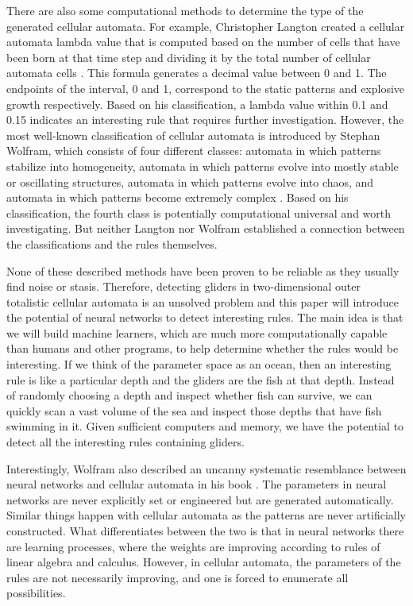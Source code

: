 \documentclass[12pt]{article}
\numberwithin{figure}{section} %
\begin{document}
There are also some computational methods to determine the type of the generated cellular automata. For example, Christopher Langton created a cellular automata lambda value that is computed based on the number of cells that have been born at that time step and dividing it by the total number of cellular automata cells \cite{Edge of Chaos}. This formula generates a decimal value between 0 and 1. The endpoints of the interval, 0 and 1, correspond to the static patterns and explosive growth respectively. Based on his classification, a lambda value within 0.1 and 0.15 indicates an interesting rule that requires further investigation. However, the most well-known classification of cellular automata is introduced by Stephan Wolfram, which consists of four different classes: automata in which patterns stabilize into homogeneity, automata in which patterns evolve into mostly stable or oscillating structures, automata in which patterns evolve into chaos, and automata in which patterns become extremely complex \cite{Cellular automaton}. Based on his classification, the fourth class is potentially computational universal and worth investigating. But neither Langton nor Wolfram established a connection between the classifications and the rules themselves.  

None of these described methods have been proven to be reliable as they usually find noise or stasis. Therefore, detecting gliders in two-dimensional outer totalistic cellular automata is an unsolved problem and this paper will introduce the potential of neural networks to detect interesting rules. The main idea is that we will build machine learners, which are much more computationally capable than humans and other programs, to help determine whether the rules would be interesting. If we think of the parameter space as an ocean, then an interesting rule is like a particular depth and the gliders are the fish at that depth. Instead of randomly choosing a depth and inspect whether fish can survive, we can quickly scan a vast volume of the sea and inspect those depths that have fish swimming in it. Given sufficient computers and memory, we have the potential to detect all the interesting rules containing gliders. 

Interestingly, Wolfram also described an uncanny systematic resemblance between neural networks and cellular automata in his book \cite{A new kind of Science}. The parameters in neural networks are never explicitly set or engineered but are generated automatically. Similar things happen with cellular automata as the patterns are never artificially constructed. What differentiates between the two is that in neural networks there are learning processes, where the weights are improving according to rules of linear algebra and calculus. However, in cellular automata, the parameters of the rules are not necessarily improving, and one is forced to enumerate all possibilities.
\end{document}
